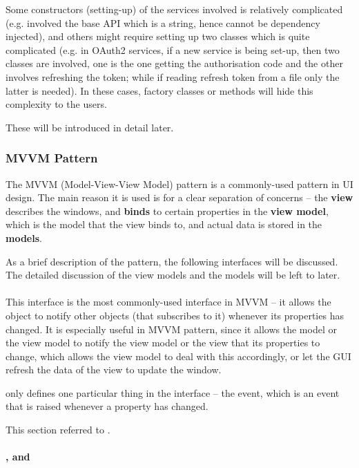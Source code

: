 Some constructors (setting-up) of the services involved is relatively complicated (e.g. involved the base API which is a string, hence cannot be dependency injected), and others might require setting up two classes which is quite complicated (e.g. in OAuth2 services, if a new service is being set-up, then two classes are involved, one is the one getting the authorisation code and the other involves refreshing the token; while if reading refresh token from a file only the latter is needed). In these cases, factory classes or methods will hide this complexity to the users.

These will be introduced in detail later.

\subsubsection{MVVM Pattern}

The MVVM (Model-View-View Model) pattern is a commonly-used pattern in UI design. The main reason it is used is for a clear separation of concerns -- the \textbf{view} describes the windows, and \textbf{binds} to certain properties in the \textbf{view model}, which is the model that the view binds to, and actual data is stored in the \textbf{models}.

As a brief description of the pattern, the following interfaces will be discussed. The detailed discussion of the view models and the models will be left to later.

\paragraph{}

This interface is the most commonly-used interface in MVVM -- it allows the object to notify other objects (that subscribes to it) whenever its properties has changed. It is especially useful in MVVM pattern, since it allows the model or the view model to notify the view model or the view that its properties to change, which allows the view model to deal with this accordingly, or let the GUI refresh the data of the view to update the window.

 only defines one particular thing in the interface -- the  event, which is an event that is raised whenever a property has changed.

This section referred to \autocite{avalonia-inotifypropertychanged}.

\paragraph{,  and }

